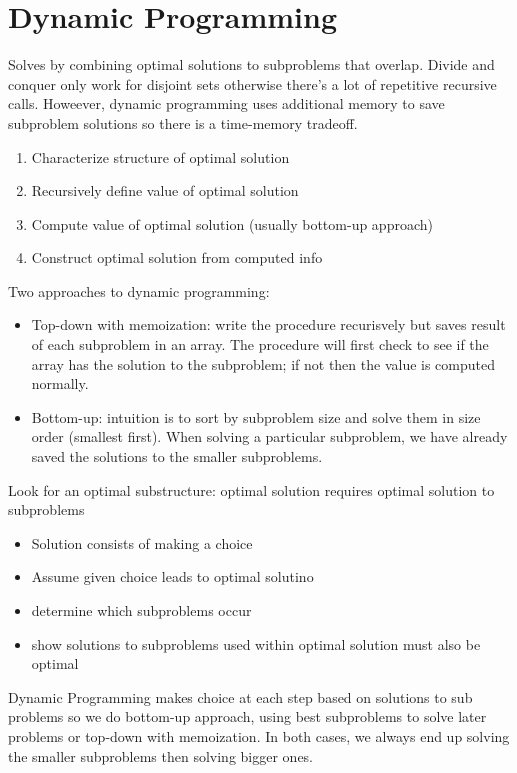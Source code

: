 \documentclass{article}
\begin{document}
  \section{Dynamic Programming}
  Solves by combining optimal solutions to subproblems that overlap. Divide and conquer only work for disjoint sets otherwise there's a lot of repetitive recursive calls. Howeever, dynamic programming uses additional memory to save subproblem solutions so there is a time-memory tradeoff. 
  \begin{enumerate}[noitemsep]
    \item Characterize structure of optimal solution 
    \item Recursively define value of optimal solution 
    \item Compute value of optimal solution (usually bottom-up approach)
    \item Construct optimal solution from computed info
  \end{enumerate}
  Two approaches to dynamic programming:
  \begin{itemize}[noitemsep]
    \item Top-down with memoization: write the procedure recurisvely but saves result of each subproblem in an array. The procedure will first check to see if the array has the solution to the subproblem; if not then the value is computed normally.
    \item Bottom-up: intuition is to sort by subproblem size and solve them in size order (smallest first). When solving a particular subproblem, we have already saved the solutions to the smaller subproblems.
  \end{itemize}
  Look for an optimal substructure: optimal solution requires optimal solution to subproblems
  \begin{itemize}[noitemsep]
    \item Solution consists of making a choice
    \item Assume given choice leads to optimal solutino 
    \item determine which subproblems occur
    \item show solutions to subproblems used within optimal solution must also be optimal
  \end{itemize}
  Dynamic Programming makes choice at each step based on solutions to sub problems so we do bottom-up approach, using best subproblems to solve later problems or top-down with memoization. In both cases, we always end up solving the smaller subproblems then solving bigger ones.
\end{document}
